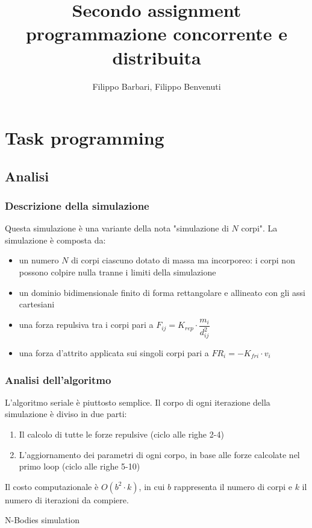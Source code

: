 \documentclass[12pt,a4paper,oneside]{article}
\begin{document}
	
	\title{Secondo assignment programmazione concorrente e distribuita}
	\author{Filippo Barbari, Filippo Benvenuti}
	\date{}%
	\maketitle
	
	\tableofcontents
	\newpage
	
	\section{Task programming}
	\subsection{Analisi}
	\subsubsection{Descrizione della simulazione}
	Questa simulazione è una variante della nota "simulazione di $N$ corpi". La simulazione è composta da:
	\begin{itemize}
		\item un numero $N$ di corpi ciascuno dotato di massa ma incorporeo: i corpi non possono colpire nulla tranne i limiti della simulazione
		\item un dominio bidimensionale finito di forma rettangolare e allineato con gli assi cartesiani
		\item una forza repulsiva tra i corpi pari a $F_{ij}=K_{rep}\cdot\dfrac{m_i}{d_{ij}^2}$
		\item una forza d'attrito applicata sui singoli corpi pari a $FR_i=-K_{fri}\cdot{v_i}$
	\end{itemize}
	
	\subsubsection{Analisi dell'algoritmo}
	L'algoritmo seriale è piuttosto semplice. Il corpo di ogni iterazione della simulazione è diviso in due parti:
	\begin{enumerate}
		\item Il calcolo di tutte le forze repulsive (ciclo alle righe 2-4)
		\item L'aggiornamento dei parametri di ogni corpo, in base alle forze calcolate nel primo loop (ciclo alle righe 5-10)
	\end{enumerate}
	Il costo computazionale è $O(b^2\cdot k)$, in cui $b$ rappresenta il numero di corpi e $k$ il numero di iterazioni da compiere.
	\begin{algorithm}
		
		\caption{N-Bodies simulation}
	\end{algorithm}
	
\end{document}
